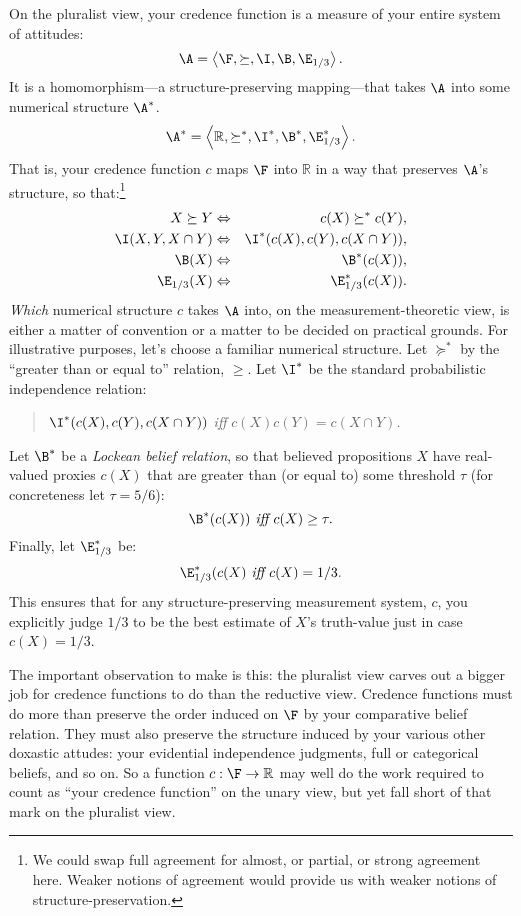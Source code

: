 On the pluralist view, your credence function is a measure of your entire system of attitudes:
$$ \A=\left<\F,\succeq,\I,\B,\E_{1/3}\right>. $$
It is a homomorphism---a structure-preserving mapping---that takes $\A$ into some numerical structure $\A^*$. 
$$ \A^*=\left<\mathbb{R},\succeq^*,\I^*,\B^*,\E_{1/3}^*\right>. $$
That is, your credence function $c$ maps $\F$ into $\mathbb{R}$ in a way that preserves $\A$'s structure, so that:\footnote{We could swap full agreement for almost, or partial, or strong agreement here. Weaker notions of agreement would provide us with weaker notions of structure-preservation.}
\begin{eqnarray*}
X\succeq Y & \Leftrightarrow & c(X)\succeq^* c(Y),\\
\I(X,Y,X\cap Y) & \Leftrightarrow & \I^*(c(X),c(Y),c(X\cap Y)),\\
\B(X) & \Leftrightarrow & \B^*(c(X)),\\
\E_{1/3}(X) & \Leftrightarrow & \E_{1/3}^*(c(X)).
\end{eqnarray*}
\textit{Which} numerical structure $c$ takes $\A$ into, on the measurement-theoretic view, is either a matter of convention or a matter to be decided on practical grounds. For illustrative purposes, let's choose a familiar numerical structure. Let $\succeq^*$ by the ``greater than or equal to'' relation, $\geq$. Let $\I^*$ be the standard probabilistic independence relation:
\begin{quote}\centering
$\I^*(c(X),c(Y),c(X\cap Y))$ \hspace{.3em}\textit{iff}\hspace{.2em} $c(X)c(Y)=c(X\cap Y)$.
\end{quote}
Let $\B^*$ be a \emph{Lockean belief relation}, so that believed propositions $X$ have real-valued proxies $c(X)$ that are greater than (or equal to) some threshold $\tau$ (for concreteness let $\tau=5/6$):
$$ \B^*(c(X)) \textit{ iff } c(X)\geq\tau. $$
Finally, let $\E^*_{1/3}$ be:
$$ \E_{1/3}^*(c(X) \textit{ iff } c(X)=1/3. $$
This ensures that for any structure-preserving measurement system, $c$, you explicitly judge $1/3$ to be the best estimate of $X$'s truth-value just in case $c(X)=1/3$.

The important observation to make is this: the pluralist view carves out a bigger job for credence functions to do than the reductive view. Credence functions must do more than preserve the order induced on $\F$ by your comparative belief relation. They must also preserve the structure induced by your various other doxastic attudes: your evidential independence judgments, full or categorical beliefs, and so on. So a function $c:\F\rightarrow\mathbb{R}$ may well do the work required to count as ``your credence function'' on the unary view, but yet fall short of that mark on the pluralist view.

